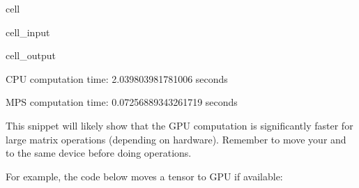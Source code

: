 \documentclass[letterpaper,10pt,english]{jupyterBook}
\begin{document}
\begin{sphinxuseclass}{cell}
\begin{sphinxVerbatimInput}
\begin{sphinxuseclass}{cell_input}
\begin{sphinxVerbatim}[commandchars=\\\{\}]
 
      
      
        
      
        
\end{sphinxVerbatim}

\end{sphinxuseclass}\end{sphinxVerbatimInput}
\begin{sphinxVerbatimOutput}

\begin{sphinxuseclass}{cell_output}
\begin{sphinxVerbatim}[commandchars=\\\{\}]
CPU computation time: 2.039803981781006 seconds
\end{sphinxVerbatim}

\begin{sphinxVerbatim}[commandchars=\\\{\}]
MPS computation time: 0.07256889343261719 seconds
\end{sphinxVerbatim}

\end{sphinxuseclass}\end{sphinxVerbatimOutput}

\end{sphinxuseclass}
\sphinxAtStartPar
This snippet will likely show that the GPU computation is significantly faster for large matrix operations (depending on hardware). Remember to move your  and  to the same device before doing operations.

\sphinxAtStartPar
For example, the code below moves a tensor to GPU if available:
\end{document}
